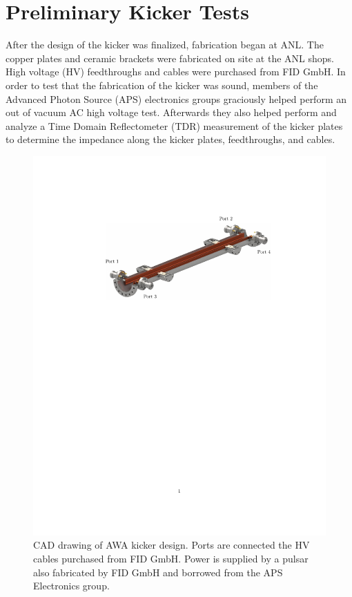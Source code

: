 \documentclass[aps,prab,preprint,groupedaddress,linenumbers]{revtex4-2}
\begin{document}
\section{Preliminary Kicker Tests}

After the design of the kicker was finalized, fabrication began at ANL.
The copper plates and ceramic brackets were fabricated on site at the ANL shops.
High voltage (HV) feedthroughs and cables were purchased from FID GmbH. 
In order to test that the fabrication of the kicker was sound, members of the 
Advanced Photon Source (APS) electronics groups graciously helped perform an 
out of vacuum AC high voltage test. Afterwards they also helped perform and 
analyze a Time Domain Reflectometer (TDR) measurement of the kicker plates
to determine the impedance along the kicker plates, feedthroughs, and cables. 
\begin{figure}
\includegraphics[width=\textwidth]{kicker_CAD}
	\caption{CAD drawing of AWA kicker design.
		Ports are connected the HV cables purchased from FID GmbH. 
		Power is supplied by a pulsar also fabricated by FID GmbH and borrowed from the APS Electronics group.}
\end{figure}\label{fig:AWAkicker}
\end{document}
